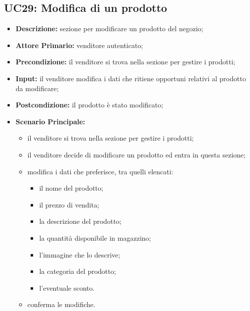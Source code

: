 \subsection{UC29: Modifica di un prodotto}
\label{sec:UC29}
\begin{itemize}
    \item \textbf{Descrizione:} sezione per modificare un prodotto del negozio;
    \item \textbf{Attore Primario:} venditore autenticato;
    \item \textbf{Precondizione:} il venditore si trova nella sezione per gestire i prodotti;
    \item \textbf{Input:} il venditore modifica i dati che ritiene opportuni relativi al prodotto da modificare;
    \item \textbf{Postcondizione:} il prodotto è stato modificato;
    \item \textbf{Scenario Principale:}
          \begin{itemize}
              \item il venditore si trova nella sezione per gestire i prodotti;
              \item il venditore decide di modificare un prodotto ed entra in questa sezione;
              \item modifica i dati che preferisce, tra quelli elencati:
                    \begin{itemize}
                        \item il nome del prodotto;
                        \item il prezzo di vendita;
                        \item la descrizione del prodotto;
                        \item la quantità disponibile in magazzino;
                        \item l'immagine che lo descrive;
                        \item la categoria del prodotto;
                        \item l'eventuale sconto.
                    \end{itemize}
              \item conferma le modifiche.
          \end{itemize}
\end{itemize}
